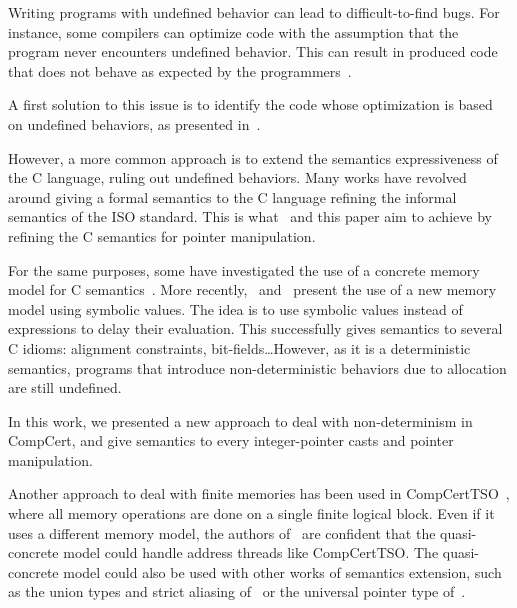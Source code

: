 Writing programs with undefined behavior can lead to difficult-to-find bugs.
For instance, some compilers can optimize code with the assumption that the program never encounters undefined behavior. This can result in produced code that does not behave as expected by the programmers~\cite{DBLP:conf/apsys/WangCCJZK12}.

A first solution to this issue is to identify the code whose optimization is based on undefined behaviors, as presented in~\cite{DBLP:conf/sosp/WangZKS13}.

However, a more common approach is to extend the semantics expressiveness of the C language, ruling out undefined behaviors.
Many works have revolved around giving a formal semantics to the C language refining the informal semantics of the ISO standard.
This is what~\cite{DBLP:conf/pldi/KangHMGZV15} and this paper aim to achieve by refining the C semantics for pointer manipulation.

For the same purposes, some have investigated the use of a concrete memory model for C semantics~\cite{DBLP:conf/popl/TuchKN07}\cite{Norrish98cformalised}.
More recently,~\cite{besson:hal-01093312} and~\cite{DBLP:conf/itp/BessonBW15} present the use of a new memory model using symbolic values. The idea is to use symbolic values instead of expressions to delay their evaluation. This successfully gives semantics to several C idioms: alignment constraints, bit-fields\dots However, as it is a deterministic semantics, programs that introduce non-deterministic behaviors due to allocation are still undefined.

In this work, we presented a new approach to deal with non-determinism in CompCert, and give semantics to every integer-pointer casts and pointer manipulation.

Another approach to deal with finite memories has been used in CompCertTSO~\cite{DBLP:journals/jacm/SevcikVNJS13}, where all memory operations are done on a single finite logical block. Even if it uses a different memory model, the authors of~\cite{DBLP:conf/pldi/KangHMGZV15} are confident that the quasi-concrete model could handle address threads like CompCertTSO.
The quasi-concrete model could also be used with other works of semantics extension, such as the union types and strict aliasing of~\cite{DBLP:conf/cpp/Krebbers13} or the universal pointer type of~\cite{DBLP:conf/itp/KrebbersLW14}.
